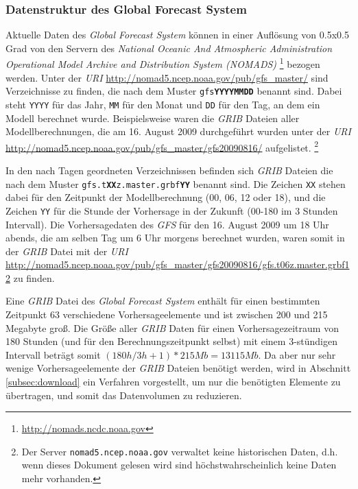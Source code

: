 \subsubsection{Datenstruktur des Global Forecast System}

Aktuelle Daten des \textit{Global Forecast System} können in einer
Auflösung von 0.5x0.5 Grad von den Servern des \textit{National Oceanic
  And Atmospheric Administration Operational Model Archive and
  Distribution System (NOMADS)} 
\footnote{\url{http://nomads.ncdc.noaa.gov}} bezogen werden. Unter der
\textit{URI} \url{http://nomad5.ncep.noaa.gov/pub/gfs_master/} sind
Verzeichnisse zu finden, die nach dem Muster
\texttt{gfs\textbf{YYYYMMDD}} benannt sind. Dabei steht \texttt{YYYY}
für das Jahr, \texttt{MM} für den Monat und \texttt{DD} für den Tag,
an dem ein Modell berechnet wurde. Beispielsweise waren die
\textit{GRIB} Dateien aller Modellberechnungen, die am 16. August 2009
durchgeführt wurden unter der \textit{URI}
\url{http://nomad5.ncep.noaa.gov/pub/gfs_master/gfs20090816/} aufgelistet.
\footnote{Der Server \texttt{nomad5.ncep.noaa.gov} verwaltet keine
  historischen Daten, d.h. wenn dieses Dokument gelesen wird sind
  höchstwahrscheinlich keine Daten mehr vorhanden.}

In den nach Tagen geordneten Verzeichnissen befinden sich
\textit{GRIB} Dateien die nach dem Muster
\texttt{gfs.t\textbf{XX}z.master.grbf\textbf{YY}} benannt sind. Die Zeichen
\texttt{XX} stehen dabei für den Zeitpunkt der Modellberechnung (00,
06, 12 oder 18), und die Zeichen \texttt{YY} für die Stunde der
Vorhersage in der Zukunft (00-180 im 3 Stunden Intervall). Die
Vorhersagedaten des \textit{GFS} für den 16. August 2009 um 18 Uhr
abends, die am selben Tag um 6 Uhr morgens berechnet wurden, waren
somit in der \textit{GRIB} Datei mit der \textit{URI}
\url{http://nomad5.ncep.noaa.gov/pub/gfs_master/gfs20090816/gfs.t06z.master.grbf12}
zu finden.

Eine \textit{GRIB} Datei des \textit{Global Forecast System} enthält
für einen bestimmten Zeitpunkt 63 verschiedene Vorhersageelemente und
ist zwischen 200 und 215 Megabyte groß. Die Größe aller \textit{GRIB}
Daten für einen Vorhersagezeitraum von 180 Stunden (und für den
Berechnungszeitpunkt selbst) mit einem 3-stündigen Intervall beträgt
somit $(180h / 3h + 1) * 215 Mb = 13115 Mb$. Da aber nur sehr wenige
Vorhersageelemente der \textit{GRIB} Dateien benötigt werden, wird in
Abschnitt \ref{subsec:download} ein Verfahren vorgestellt, um nur die
benötigten Elemente zu übertragen, und somit das Datenvolumen zu
reduzieren.

